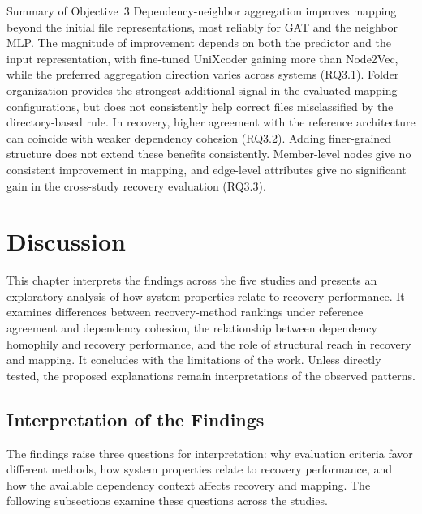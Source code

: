 \begin{GrayBox}{Summary of Objective~3}
Dependency-neighbor aggregation improves mapping beyond the initial file representations, most reliably for GAT and the neighbor MLP. The magnitude of improvement depends on both the predictor and the input representation, with fine-tuned UniXcoder gaining more than Node2Vec, while the preferred aggregation direction varies across systems (RQ3.1). Folder organization provides the strongest additional signal in the evaluated mapping configurations, but does not consistently help correct files misclassified by the directory-based rule. In recovery, higher agreement with the reference architecture can coincide with weaker dependency cohesion (RQ3.2). Adding finer-grained structure does not extend these benefits consistently. Member-level nodes give no consistent improvement in mapping, and edge-level attributes give no significant gain in the cross-study recovery evaluation (RQ3.3).
\end{GrayBox}

\chapter{Discussion \label{ch:discussion}}
 \chaptertoc

This chapter interprets the findings across the five studies and presents an exploratory analysis of how system properties relate to recovery performance. It examines differences between recovery-method rankings under reference agreement and dependency cohesion, the relationship between dependency homophily and recovery performance, and the role of structural reach in recovery and mapping. It concludes with the limitations of the work. Unless directly tested, the proposed explanations remain interpretations of the observed patterns.

\section{Interpretation of the Findings}

The findings raise three questions for interpretation: why evaluation criteria favor different methods, how system properties relate to recovery performance, and how the available dependency context affects recovery and mapping. The following subsections examine these questions across the studies.

